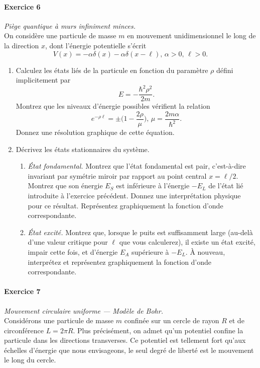\paragraph{Exercice 6} \textit{Piège quantique à murs infiniment minces.} \\
On considère une particule de masse $m$ en mouvement unidimensionnel le long de la direction $x$, dont l'énergie potentielle s'écrit
\begin{equation}
V(x) = -\alpha \delta(x)-\alpha \delta(x-\ell), \, \alpha>0,\, \ell >0.
\end{equation}
\begin{enumerate}
\item Calculez les états liés de la particule en fonction du paramètre $\rho$ défini implicitement par 
\begin{equation}
E = -\frac{\hbar^2\rho^2}{2m}.
\end{equation}
Montrez que les niveaux d'énergie possibles vérifient la relation
\begin{equation}
e^{-\rho\ell} = \pm \Big( 1 - \frac{2\rho}{\mu} \Big), \,\mu = \frac{2m\alpha}{\hbar^2}.
\end{equation}
Donnez une résolution graphique de cette équation.
\item Décrivez les états stationnaires du système.
	\begin{enumerate}
	\item \textit{État fondamental.} Montrez que l'état fondamental est pair, c'est-à-dire invariant par symétrie miroir par rapport au point central $x=\ell/2$. Montrez que son énergie $E_S$ est inférieure à l'énergie $-E_L$ de l'état lié introduite à l'exercice précédent. Donnez une interprétation physique pour ce résultat. Représentez graphiquement la fonction d'onde correspondante.
	\item \textit{État excité.} Montrez que, lorsque le puits est suffisamment large (au-delà d'une valeur critique pour $\ell$ que vous calculerez), il existe un état excité, impair cette fois, et d'énergie $E_A$ supérieure à $-E_L$. À nouveau, interprétez et représentez graphiquement la fonction d'onde correspondante.
	\end{enumerate}
\end{enumerate}
\newpage

\paragraph{Exercice 7} \textit{Mouvement circulaire uniforme --- Modèle de Bohr.}  \\
Considérons une particule de masse $m$ confinée sur un cercle de rayon $R$ et de circonférence $L = 2\pi R$. Plus précisément, on admet qu'un potentiel confine la particule dans les directions transverses. Ce potentiel est tellement fort qu'aux échelles d'énergie que nous envisageons, le seul degré de liberté est le mouvement le long du cercle.\\

